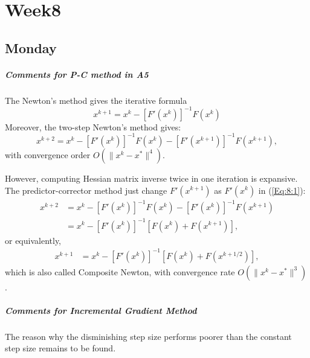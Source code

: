 
\chapter{Week8}

\section{Monday}
\paragraph{Comments for P-C method in A5}
The Newton's method gives the iterative formula
\[
x^{k+1} = x^k - [F'(x^k)]^{-1}F(x^k)
\]
Moreover, the two-step Newton's method gives:
\begin{equation}\label{Eq:8:1}
x^{k+2} = x^k - [F'(x^k)]^{-1}F(x^k)-[F'(x^{k+1})]^{-1}F(x^{k+1}),
\end{equation}
with convergence order $O(\|x^k-x^*\|^4)$.

However, computing Hessian matrix inverse twice in one iteration is expansive. The predictor-corrector method just change $F'(x^{k+1})$ as $F'(x^{k})$ in (\ref{Eq:8:1}):
\begin{align*}
x^{k+2} &= x^k - [F'(x^k)]^{-1}F(x^k)-[F'(x^{k})]^{-1}F(x^{k+1})\\
&=x^k - [F'(x^k)]^{-1}[F(x^k)+F(x^{k+1})],
\end{align*}
or equivalently,
\begin{align*}
x^{k+1} &= x^k - [F'(x^k)]^{-1}[F(x^k)+F(x^{k+1/2})],
\end{align*}
which is also called Composite Newton, with convergence rate $O(\|x^{k}-x^*\|^{3})$.
\paragraph{Comments for Incremental Gradient Method}
The reason why the disminishing step size performs poorer than the constant step size remains to be found.


